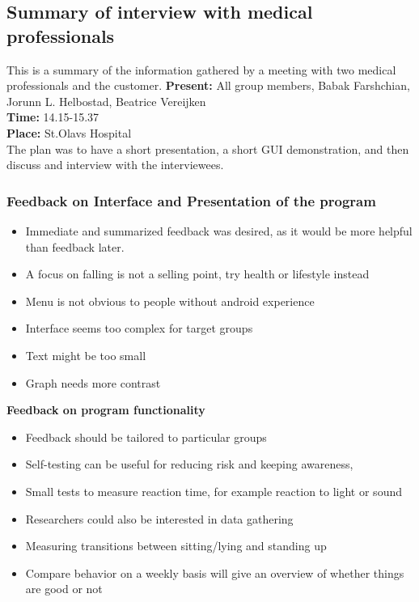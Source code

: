 \subsection{Summary of interview with medical professionals}
This is a summary of the information gathered by a meeting with two medical professionals and the customer.
\textbf{Present:} All group members, Babak Farshchian, Jorunn L. Helbostad, Beatrice Vereijken \\
\textbf{Time:} 14.15-15.37\\
\textbf{Place:} St.Olavs Hospital\\
The plan was to have a short presentation, a short GUI demonstration, and then discuss and interview with the interviewees. \\
\subsubsection*{Feedback on Interface and Presentation of the program}
\begin{itemize}
\item Immediate and summarized feedback was desired, as it would be more helpful than feedback later.
\item A focus on falling is not a selling point, try health or lifestyle instead
\item Menu is not obvious to people without android experience
\item Interface seems too complex for target groups
\item Text might be too small
\item Graph needs more contrast 

\end{itemize}

\textbf{Feedback on program functionality}
\begin{itemize}
\item Feedback should be tailored to particular groups
\item Self-testing can be useful for reducing risk and keeping awareness,
\item Small tests to measure reaction time, for example reaction to light or sound
\item Researchers could also be interested in data gathering
\item Measuring transitions between sitting/lying and standing up
\item Compare behavior on a weekly basis will give an overview of whether things are good or not
\end{itemize}


